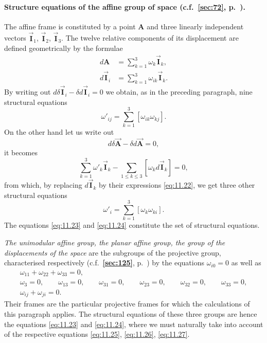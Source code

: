 \documentclass[leqno,11pt]{book}
\numberwithin{equation}{chapter}
\theoremstyle{shape1}
\theoremstyle{shapesmall}
\newcommand{\fsref}[1]{{\rm\textsection\textbf{\ref{sec:#1}}}}
\newcommand{\rvec}[1]{\vec{\mathbf{#1}}}
\newcommand{\ivec}{\rvec{I}}
\begin{document}
\paragraph[{Structure equations of the affine group of space.}]{Structure equations of the affine group of space (c.f.~\fsref{72}, p.~\pageref{sec:72}).}
\label{sec:160}
The affine frame is constituted by a point $\mathbf{A}$ and three linearly independent vectors $\ivec_{1}$, $\ivec_{2}$, $\ivec_{3}$. The twelve relative components of its displacement are defined geometrically by the formulae
\begin{align}
  \label{eq:11.21}
  d\mathbf{A}&=\sum_{k=1}^{3}\omega_{k}\ivec_{k},\\
  \label{eq:11.22}
  d\ivec_{i}&=\sum_{k=1}^{3}\omega_{ik}\ivec_{k}.
\end{align}
By writing out $d\delta\ivec_{i}-\delta d\ivec_{i}=0$ we obtain, as in the preceding paragraph, nine structural equations
\begin{equation}
  \label{eq:11.23}
  \omega'_{ij}=\sum_{k=1}^{3}[\omega_{ik}\omega_{kj}].
\end{equation}
On the other hand let us write out
\[
d\delta\vec{\mathbf{A}}-\delta d\vec{\mathbf{A}}=0,
\]
it becomes
\[
\sum_{k=1}^{3}\omega'_{k}\ivec_{k}-\sum_{1\le k\le 3}[\omega_{k}d\ivec_{k}]=0,
\]
from which, by replacing $d\ivec_{k}$ by their expressions \eqref{eq:11.22}, we get three other structural equations
\begin{equation}
  \label{eq:11.24}
  \omega'_{i}=\sum_{k=1}^{3}[\omega_{k}\omega_{ki}].
\end{equation}
The equations \eqref{eq:11.23} and \eqref{eq:11.24} constitute the set of structural equations.

\emph{The unimodular affine group, the planar affine group, the group of the displacements of the space} are the subgroups of the projective group, characterised respectively (c.f.~\fsref{125}, p.~\pageref{sec:125}) by the equations $\omega_{i0}=0$ as well as
\begin{gather}
  \label{eq:11.25}
  \omega_{11}+\omega_{22}+\omega_{33}=0,\\
  \label{eq:11.26}
  \omega_{3}=0,\qquad\omega_{13}=0,\qquad\omega_{31}=0,\qquad\omega_{23}=0,\qquad\omega_{32}=0,\qquad\omega_{33}=0,\\
  \label{eq:11.27}
  \omega_{ij}+\omega_{ji}=0.
\end{gather}
Their frames are the particular projective frames for which the calculations of this paragraph applies. The structural equations of these three groups are hence the equations \eqref{eq:11.23} and \eqref{eq:11.24}, where we must naturally take into account of the respective equations \eqref{eq:11.25}, \eqref{eq:11.26}, \eqref{eq:11.27}.
\end{document}

